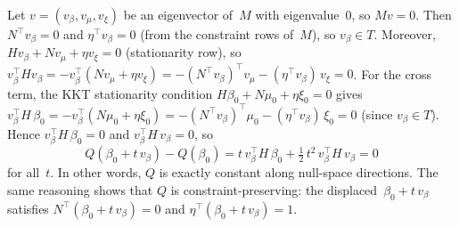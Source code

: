 \begin{remark}%
\label{rem:null-q-constant}
Let $v = (v_\beta, v_\mu, v_\xi)$ be an eigenvector of~$M$
with eigenvalue~$0$, so $Mv = 0$.
Then $N^\top v_\beta = 0$ and $\eta^\top v_\beta = 0$
(from the constraint rows of~$M$),
so $v_\beta \in T$.
Moreover, $H v_\beta + N v_\mu + \eta v_\xi = 0$
(stationarity row), so
$v_\beta^\top H v_\beta
  = -v_\beta^\top(N v_\mu + \eta v_\xi)
  = -(N^\top v_\beta)^\top v_\mu
    - (\eta^\top v_\beta)\,v_\xi = 0$.
For the cross term, the KKT stationarity condition
$H\beta_0 + N\mu_0 + \eta\xi_0 = 0$ gives
$v_\beta^\top H\,\beta_0
  = -v_\beta^\top(N\mu_0 + \eta\xi_0)
  = -(N^\top v_\beta)^\top\mu_0
    - (\eta^\top v_\beta)\,\xi_0 = 0$
(since $v_\beta \in T$).
Hence $v_\beta^\top H\,\beta_0 = 0$
and $v_\beta^\top H\,v_\beta = 0$, so
\[
  Q(\beta_0 + t\,v_\beta) - Q(\beta_0)
  = t\,v_\beta^\top H\,\beta_0
    + \tfrac{1}{2}\,t^2\,v_\beta^\top H\,v_\beta
  = 0
\]
for all~$t$.
In other words, $Q$ is exactly constant along
null-space directions.
The same reasoning shows that $Q$ is
constraint-preserving:
the displaced~$\beta_0 + t\,v_\beta$ satisfies
$N^\top(\beta_0 + t\,v_\beta) = 0$ and
$\eta^\top(\beta_0 + t\,v_\beta) = 1$.
\end{remark}

